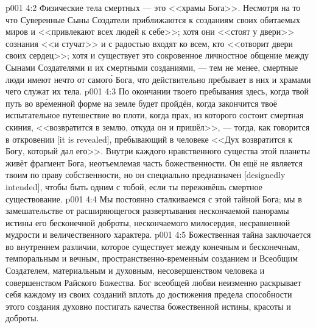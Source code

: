 \vs p001 4:2 Физические тела смертных --- это <<храмы Бога>>. Несмотря на то что Суверенные Сыны Создатели приближаются к созданиям своих обитаемых миров и <<привлекают всех людей к себе>>; хотя они <<стоят у двери>> сознания <<и стучат>> и с радостью входят ко всем, кто <<отворит двери своих сердец>>; хотя и существует это сокровенное личностное общение между Сынами Создателями и их смертными созданиями, --- тем не менее, смертные люди имеют нечто от самог\'о Бога, что действительно пребывает в них и храмами чего служат их тела.
\vs p001 4:3 По окончании твоего пребывания здесь, когда твой путь во вр\'еменной форме на земле будет пройдён, когда закончится твоё испытательное путешествие во плоти, когда прах, из которого состоит смертная скиния, <<возвратится в землю, откуда он и пришёл>>, --- тогда, как говорится в откровении [it is revealed], пребывающий в человеке <<Дух возвратится к Богу, который дал его>>. Внутри каждого нравственного существа этой планеты живёт фрагмент Бога, неотъемлемая часть божественности. Он ещё не является твоим по праву собственности, но он специально предназначен [designedly intended], чтобы быть одним с тобой, если ты переживёшь смертное существование.
\vs p001 4:4 \pc Мы постоянно сталкиваемся с этой тайной Бога; мы в замешательстве от расширяющегося развертывания нескончаемой панорамы истины его бесконечной доброты, нескончаемого милосердия, несравненной мудрости и величественного характера.
\vs p001 4:5 \pc Божественная тайна заключается во внутреннем различии, которое существует между конечным и бесконечным, темпоральным и вечным, пространственно\hyp{}временн\'ым созданием и Всеобщим Создателем, материальным и духовным, несовершенством человека и совершенством Райского Божества. Бог всеобщей любви неизменно раскрывает себя каждому из своих созданий вплоть до достижения предела способности этого создания духовно постигать качества божественной истины, красоты и доброты.

